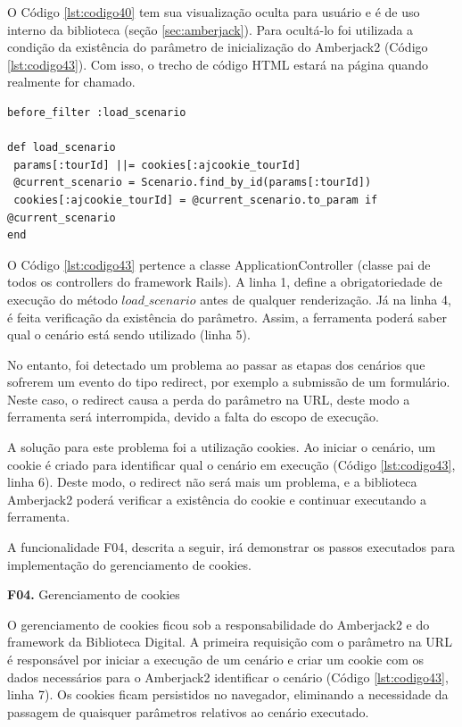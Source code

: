 O Código \ref{lst:codigo40} tem sua visualização oculta para usuário e é de uso interno da biblioteca (seção \ref{sec:amberjack}). Para ocultá-lo foi utilizada a condição da existência do parâmetro de inicialização do Amberjack2 (Código \ref{lst:codigo43}). Com isso, o trecho de código HTML estará na página quando realmente for chamado.

{\singlespace
\begin{lstlisting}[caption=Método para carregar o cenário,label={lst:codigo43}]
before_filter :load_scenario

def load_scenario
 params[:tourId] ||= cookies[:ajcookie_tourId]
 @current_scenario = Scenario.find_by_id(params[:tourId])
 cookies[:ajcookie_tourId] = @current_scenario.to_param if @current_scenario
end
\end{lstlisting}
}

O Código \ref{lst:codigo43} pertence a classe ApplicationController (classe pai de todos os controllers do framework Rails). A linha 1, define a obrigatoriedade de execução do método \textit{$load\_scenario$} antes de qualquer renderização. Já na linha 4, é feita verificação da existência do parâmetro. Assim, a ferramenta poderá saber qual o cenário está sendo utilizado (linha 5).

No entanto, foi detectado um problema ao passar as etapas dos cenários que sofrerem um evento do tipo redirect\footnotemark[1], por exemplo a submissão de um formulário. Neste caso, o redirect causa a perda do parâmetro na URL, deste modo a ferramenta será interrompida, devido a falta do escopo de execução.

A solução para este problema foi a utilização cookies\footnotemark[2]. Ao iniciar o cenário, um cookie é criado para identificar qual o cenário em execução (Código \ref{lst:codigo43}, linha 6). Deste modo, o redirect não será mais um problema, e a biblioteca Amberjack2 poderá verificar a existência do cookie e continuar executando a ferramenta.

A funcionalidade F04, descrita a seguir, irá demonstrar os passos executados para implementação do gerenciamento de cookies.


\textbf{F04.} Gerenciamento de cookies

O gerenciamento de cookies ficou sob a responsabilidade do Amberjack2 e do framework da Biblioteca Digital. A primeira requisição com o parâmetro na URL é responsável por iniciar a execução de um cenário e criar um cookie com os dados necessários para o Amberjack2 identificar o cenário (Código \ref{lst:codigo43}, linha 7). Os cookies ficam persistidos no navegador, eliminando a necessidade da passagem de quaisquer parâmetros relativos ao cenário executado.

